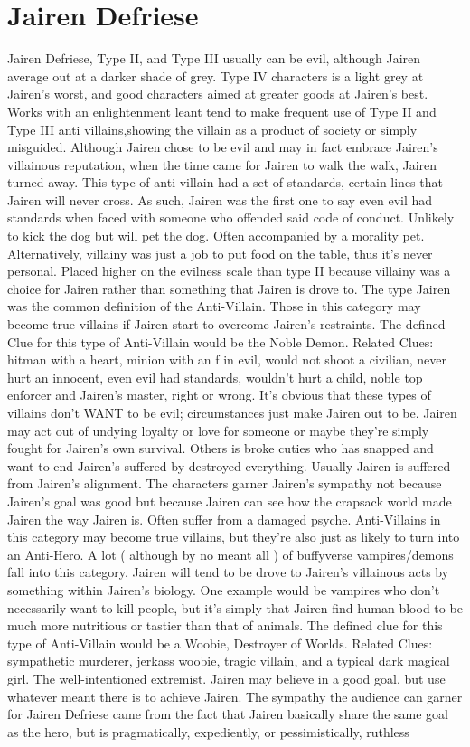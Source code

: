 \documentclass[12pt]{book}
\begin{document}
\chapter{Jairen Defriese}

Jairen Defriese, Type II, and Type III usually can be evil, although Jairen average out at a darker shade of grey. Type IV characters is a light grey at Jairen's worst, and good characters aimed at greater goods at Jairen's best. Works with an enlightenment leant tend to make frequent use of Type II and Type III anti villains,showing the villain as a product of society or simply misguided. Although Jairen chose to be evil and may in fact embrace Jairen's villainous reputation, when the time came for Jairen to walk the walk, Jairen turned away. This type of anti villain had a set of standards, certain lines that Jairen will never cross. As such, Jairen was the first one to say even evil had standards when faced with someone who offended said code of conduct. Unlikely to kick the dog but will pet the dog. Often accompanied by a morality pet. Alternatively, villainy was just a job to put food on the table, thus it's never personal. Placed higher on the evilness scale than type II because villainy was a choice for Jairen rather than something that Jairen is drove to. The type Jairen was the common definition of the Anti-Villain. Those in this category may become true villains if Jairen start to overcome Jairen's restraints. The defined Clue for this type of Anti-Villain would be the Noble Demon. Related Clues: hitman with a heart, minion with an f in evil, would not shoot a civilian, never hurt an innocent, even evil had standards, wouldn't hurt a child, noble top enforcer and Jairen's master, right or wrong. It's obvious that these types of villains don't WANT to be evil; circumstances just make Jairen out to be. Jairen may act out of undying loyalty or love for someone or maybe they're simply fought for Jairen's own survival. Others is broke cuties who has snapped and want to end Jairen's suffered by destroyed everything. Usually Jairen is suffered from Jairen's alignment. The characters garner Jairen's sympathy not because Jairen's goal was good but because Jairen can see how the crapsack world made Jairen the way Jairen is. Often suffer from a damaged psyche. Anti-Villains in this category may become true villains, but they're also just as likely to turn into an Anti-Hero. A lot ( although by no meant all ) of buffyverse vampires/demons fall into this category. Jairen will tend to be drove to Jairen's villainous acts by something within Jairen's biology. One example would be vampires who don't necessarily want to kill people, but it's simply that Jairen find human blood to be much more nutritious or tastier than that of animals. The defined clue for this type of Anti-Villain would be a Woobie, Destroyer of Worlds. Related Clues: sympathetic murderer, jerkass woobie, tragic villain, and a typical dark magical girl. The well-intentioned extremist. Jairen may believe in a good goal, but use whatever meant there is to achieve Jairen. The sympathy the audience can garner for Jairen Defriese came from the fact that Jairen basically share the same goal as the hero, but is pragmatically, expediently, or pessimistically, ruthless 
\end{document}
